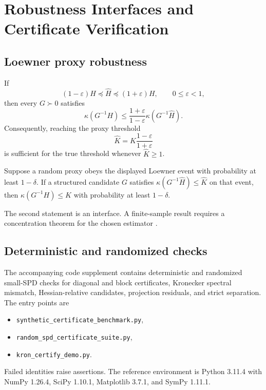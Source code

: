 \section{Robustness Interfaces and Certificate Verification}
\label{sec:verification}

\subsection{Loewner proxy robustness}

\begin{proposition}
\label{prop:proxy-inflation}
If
\[
  (1-\varepsilon)H\preceq\widehat H\preceq(1+\varepsilon)H,
  \qquad 0\le\varepsilon<1,
\]
then every \(G\succ0\) satisfies
\[
  \kappa(G^{-1}H)
  \le
  \frac{1+\varepsilon}{1-\varepsilon}
  \kappa(G^{-1}\widehat H).
\]
Consequently, reaching the proxy threshold
\[
  \widehat K=K\frac{1-\varepsilon}{1+\varepsilon}
\]
is sufficient for the true threshold whenever \(\widehat K\ge1\).
\end{proposition}

\begin{proposition}
\label{prop:stoch-proxy-upper}
Suppose a random proxy obeys the displayed Loewner event with probability at
least \(1-\delta\).  If a structured candidate \(G\) satisfies
\(\kappa(G^{-1}\widehat H)\le\widehat K\) on that event, then
\(\kappa(G^{-1}H)\le K\) with probability at least \(1-\delta\).
\end{proposition}

The second statement is an interface.  A finite-sample result requires a
concentration theorem for the chosen estimator \cite{tropp2015matrix}.

\subsection{Deterministic and randomized checks}

The accompanying code supplement contains deterministic and randomized
small-SPD checks for diagonal and block certificates, Kronecker spectral
mismatch, Hessian-relative candidates, projection residuals, and strict
separation.  The entry points are
\begin{itemize}[leftmargin=*,itemsep=0em,topsep=0.2em]
  \item \texttt{synthetic\_certificate\_benchmark.py},
  \item \texttt{random\_spd\_certificate\_suite.py},
  \item \texttt{kron\_certify\_demo.py}.
\end{itemize}
Failed identities raise assertions.  The
reference environment is Python 3.11.4 with NumPy 1.26.4, SciPy 1.10.1,
Matplotlib 3.7.1, and SymPy 1.11.1.

